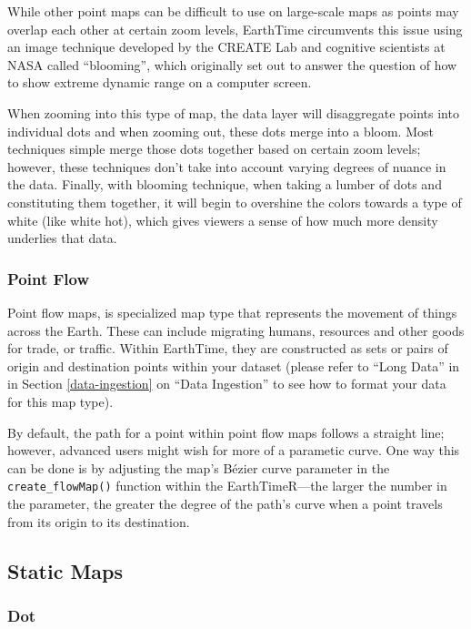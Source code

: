 \documentclass[
]{krantz}
\begin{document}
While other point maps can be difficult to use on large-scale maps as points may overlap each other at certain zoom levels, EarthTime circumvents this issue using an image technique developed by the CREATE Lab and cognitive scientists at NASA called ``blooming'', which originally set out to answer the question of how to show extreme dynamic range on a computer screen.

When zooming into this type of map, the data layer will disaggregate points into individual dots and when zooming out, these dots merge into a bloom. Most techniques simple merge those dots together based on certain zoom levels; however, these techniques don't take into account varying degrees of nuance in the data. Finally, with blooming technique, when taking a lumber of dots and constituting them together, it will begin to overshine the colors towards a type of white (like white hot), which gives viewers a sense of how much more density underlies that data.

\hypertarget{point-flow}{%
\subsubsection*{Point Flow}\label{point-flow}}


Point flow maps, is specialized map type that represents the movement of things across the Earth. These can include migrating humans, resources and other goods for trade, or traffic. Within EarthTime, they are constructed as sets or pairs of origin and destination points within your dataset (please refer to ``Long Data'' in in Section \ref{data-ingestion} on ``Data Ingestion'' to see how to format your data for this map type).

By default, the path for a point within point flow maps follows a straight line; however, advanced users might wish for more of a parametic curve. One way this can be done is by adjusting the map's Bézier curve parameter in the \texttt{create\_flowMap()} function within the EarthTimeR---the larger the number in the parameter, the greater the degree of the path's curve when a point travels from its origin to its destination.

\hypertarget{static-maps}{%
\subsection*{Static Maps}\label{static-maps}}


\hypertarget{dot}{%
\subsubsection*{Dot}\label{dot}}
\end{document}
